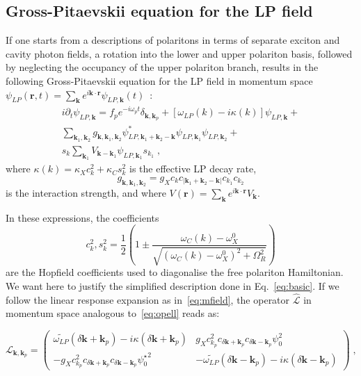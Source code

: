 \begin{subappendices}
\section{Gross-Pitaevskii equation for the LP field}
\label{app:full}
%
If one starts from a descriptions of polaritons in terms of separate
exciton and cavity photon fields, a rotation into the lower and upper
polariton basis, followed by neglecting the occupancy of the upper
polariton branch, results in the following Gross-Pitaevskii equation
for the LP field in momentum space
$\psi_{LP}(\bm{r},t) = \sum_{\bm{k}} e^{i\bm{k}\cdot \bm{r}}
\psi_{LP,\bm{k}} (t)$~\cite{Ciuti_2003}:
%
\begin{multline}
  i\partial_t \psi_{LP,\bm{k}} = f_p e^{-i\omega_p t}
  \delta_{\bm{k},\bm{k}_p} + \left[\omega_{LP} (k) - i\kappa
    (k)\right]\psi_{LP,\bm{k}} +\\
%
  \sum_{\bm{k}_1, \bm{k}_2} g_{\bm{k}, \bm{k}_1, \bm{k}_2}
  \psi^*_{LP,\bm{k}_1 + \bm{k}_2-\bm{k}} \psi_{LP,\bm{k}_1}
  \psi_{LP,\bm{k}_2} +\\ s_k \sum_{\bm{k}_1} V_{\bm{k} -
    \bm{k}_1} \psi_{LP,\bm{k}_1} s_{k_1}\; ,
\end{multline}
%
where $\kappa(k)=\kappa_X c^2_k + \kappa_C s^2_k$ is the effective LP
decay rate,
%
\begin{equation}
  g_{\bm{k}, \bm{k}_1, \bm{k}_2}=g_X c_{k}c_{|\bm{k}_1 + \bm{k}_2-\bm{k}|} c_{k_1} c_{k_2}
\end{equation}
%
is the interaction strength, and where
$V(\bm{r}) = \sum_{\bm{k}} e^{i\bm{k}\cdot \bm{r}} V_{\bm{k}}$.

In these expressions, the coefficients
%
\begin{equation}
  c^2_{k}, s^2_{k} = \frac{1}{2} \left(1 \pm \frac{\omega_C(k) -
    \omega_X^0}{\sqrt{(\omega_C(k) - \omega_X^0)^2 +
      \Omega_R^2}}\right)
\end{equation}
%
are the Hopfield coefficients used to diagonalise the free polariton
Hamiltonian. We want here to justify the simplified description done
in Eq.~\eqref{eq:basic}. If we follow the linear response expansion as
in~\eqref{eq:mfield}, the operator $\hat{\mathcal{L}}$ in momentum
space analogous to~\eqref{eq:opell} reads as:

%
\begin{equation}
  \mathcal{L}_{\bm{k},\bm{k}_p} = \begin{pmatrix}
    \widetilde{\omega_{LP}} (\delta \bm{k}+\bm{k}_p) - i
    \kappa(\delta \bm{k}+\bm{k}_p) & g_X c_{k_p}^2 c_{\delta
      \bm{k}+\bm{k}_p} c_{\delta \bm{k}-\bm{k}_p} \psi_0^2
    \\ - g_X c_{k_p}^2 c_{\delta \bm{k}+\bm{k}_p} c_{\delta
      \bm{k}-\bm{k}_p}{\psi_0^{\star}}^2 & -
    \widetilde{\omega_{LP}}(\delta \bm{k}-\bm{k}_p) -
    i\kappa(\delta \bm{k}-\bm{k}_p) \end{pmatrix}\; ,
\label{eq:opel2}
\end{equation}
%


\end{subappendices}
